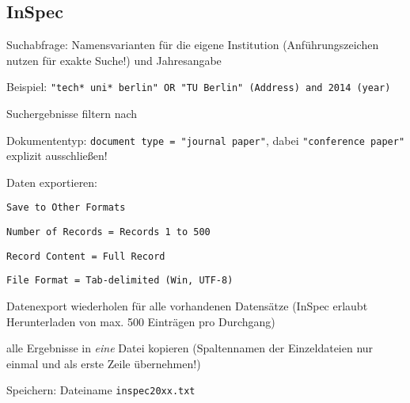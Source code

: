 \subsection*{InSpec}
\begin{compactitem}
\item Suchabfrage: Namensvarianten für die eigene Institution (Anführungszeichen nutzen für exakte Suche!)  und Jahresangabe
	\begin{compactitem}
    \item Beispiel: \texttt{"{}tech* uni* berlin"{}  OR "{}TU Berlin"{} (Address) and 2014 (year)}
    \end{compactitem}
\item Suchergebnisse filtern nach
	\begin{compactitem}
    \item Dokumententyp: \texttt{document type = "{}journal paper"{}}, dabei \texttt{"{}conference paper"{}} explizit ausschließen!
    \end{compactitem}
\item Daten exportieren: 
	\begin{compactitem}
	\item \texttt{Save to Other Formats}
    \item \texttt{Number of Records = Records 1 to 500}
    \item \texttt{Record Content = Full Record}
    \item \texttt{File Format = Tab-delimited (Win, UTF-8)}
	\end{compactitem}
\item Datenexport wiederholen für alle vorhandenen Datensätze (InSpec erlaubt Herunterladen von max. 500 Einträgen pro Durchgang)
\item alle Ergebnisse in \textit{eine} Datei kopieren (Spaltennamen der Einzeldateien nur einmal und als erste Zeile übernehmen!)
\item Speichern: Dateiname \texttt{inspec20xx.txt}
\end{compactitem}

